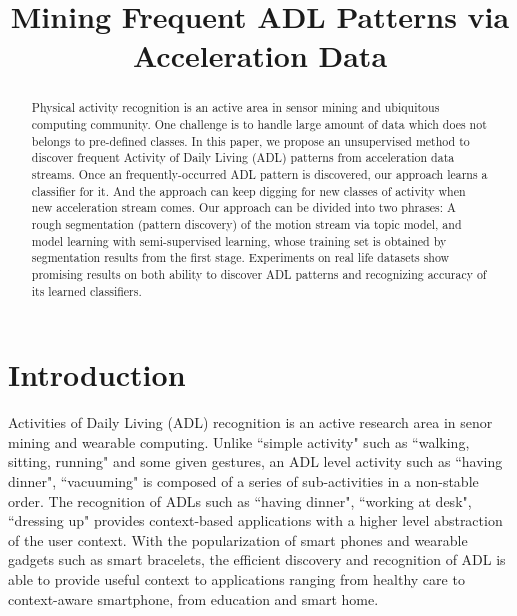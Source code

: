 \documentclass{sigchi}
\begin{document}
\title{Mining Frequent ADL Patterns via Acceleration Data}



\maketitle

\begin{abstract}
Physical activity recognition is an active area in sensor mining and ubiquitous computing community.
One challenge is to handle large amount of data which does not belongs to pre-defined classes.
In this paper, we propose an unsupervised method to discover frequent Activity of Daily Living (ADL) patterns from acceleration data streams.
Once an frequently-occurred ADL pattern is discovered, our approach learns a classifier for it.
And the approach can keep digging for new classes of activity when new acceleration stream comes.
Our approach can be divided into two phrases:
 A rough segmentation (pattern discovery) of the motion stream via topic model, and model learning with semi-supervised learning, whose training set is obtained by segmentation results from the first stage.
 Experiments on real life datasets show promising results on both ability to discover ADL patterns and recognizing accuracy of its learned classifiers.
\end{abstract}


\section{Introduction}

Activities of Daily Living (ADL) recognition is an active research area in senor mining and wearable computing.
Unlike ``simple activity" such as ``walking, sitting, running" and some given gestures, an ADL level activity such as ``having dinner", ``vacuuming" is composed of a series of sub-activities in a non-stable order.
The recognition of ADLs such as ``having dinner", ``working at desk", ``dressing up" provides context-based applications with a higher level abstraction of the user context.
With the popularization of smart phones and wearable gadgets such as smart bracelets, the efficient discovery and recognition of ADL is able to provide useful context to applications ranging from healthy care to context-aware smartphone, from education and smart home.
\end{document}
